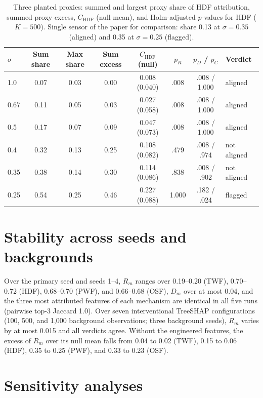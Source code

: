 \documentclass[10pt]{article}
\begin{document}
\begin{table}[htbp]
\centering
\caption{Three planted proxies: summed and largest proxy share of HDF attribution, summed proxy excess, $C_{\mathrm{HDF}}$ (null mean), and Holm-adjusted $p$-values for HDF ($K=500$). Single sensor of the paper for comparison: share 0.13 at $\sigma=0.35$ (aligned) and 0.35 at $\sigma=0.25$ (flagged).}
\label{tab:proxies}
\small
\begin{tabular}{@{}lccccccl@{}}
\toprule
$\sigma$ & Sum share & Max share & Sum excess & $C_{\mathrm{HDF}}$ (null) & $p_R$ & $p_D$ / $p_C$ & Verdict \\
\midrule
1.0 & 0.07 & 0.03 & 0.00 & 0.008 (0.040) & .008 & .008 / 1.000 & aligned \\
0.67 & 0.11 & 0.05 & 0.03 & 0.027 (0.058) & .008 & .008 / 1.000 & aligned \\
0.5 & 0.17 & 0.07 & 0.09 & 0.047 (0.073) & .008 & .008 / 1.000 & aligned \\
0.4 & 0.32 & 0.13 & 0.25 & 0.108 (0.082) & .479 & .008 / .974 & not aligned \\
0.35 & 0.38 & 0.14 & 0.30 & 0.114 (0.086) & .838 & .008 / .902 & not aligned \\
0.25 & 0.54 & 0.25 & 0.46 & 0.227 (0.088) & 1.000 & .182 / .024 & flagged \\
\bottomrule
\end{tabular}
\end{table}

\section{Stability across seeds and backgrounds}

Over the primary seed and seeds 1--4, $R_m$ ranges over 0.19--0.20 (TWF), 0.70--0.72 (HDF), 0.68--0.70 (PWF), and 0.66--0.68 (OSF), $D_m$ over at most 0.04, and the three most attributed features of each mechanism are identical in all five runs (pairwise top-3 Jaccard 1.0). Over seven interventional TreeSHAP configurations (100, 500, and 1{,}000 background observations; three background seeds), $R_m$ varies by at most 0.015 and all verdicts agree. Without the engineered features, the excess of $R_m$ over its null mean falls from 0.04 to 0.02 (TWF), 0.15 to 0.06 (HDF), 0.35 to 0.25 (PWF), and 0.33 to 0.23 (OSF).

\section{Sensitivity analyses}
\end{document}
